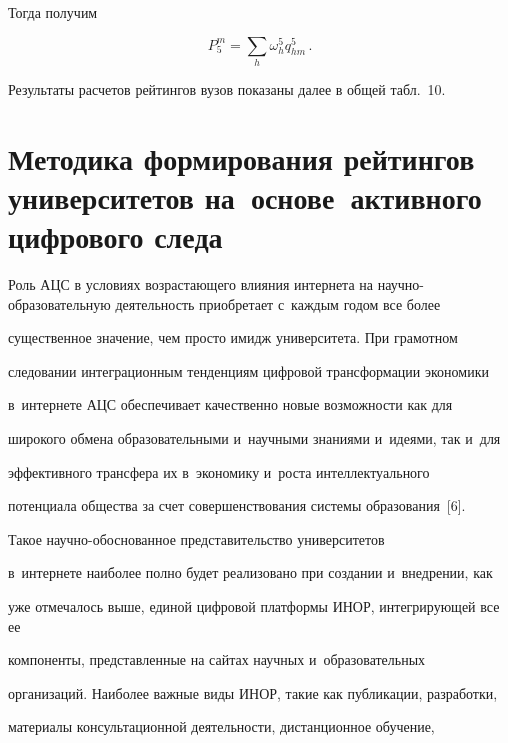 \noindent


Тогда получим


\begin{equation*}


P_5^m= \sum\limits_h \omega^5_h q^5_{hm}\,.




\end{equation*}


  


  Результаты расчетов рейтингов вузов показаны далее в общей табл.~10. 





\section{Методика формирования рейтингов университетов на~основе~активного цифрового следа}





  Роль АЦС в условиях возрастающего влияния интернета на на\-уч\-но-об\-ра\-зо\-ва\-тель\-ную деятельность приобретает с~каждым годом все более 


существенное значение, чем просто имидж университета. При грамотном 


следовании интеграционным тенденциям цифровой трансформации экономики 


в~интернете АЦС обеспечивает качественно новые возможности как для 


широкого обмена образовательными и~научными знаниями и~идеями, так и~для 


эффективного трансфера их в~экономику и~роста интеллектуального 


потенциала общества за счет совершенствования сис\-те\-мы образования~[6]. 


Такое на\-уч\-но-обосно\-ван\-ное представительство университетов 


в~интернете наиболее полно будет реализовано при создании и~внед\-ре\-нии, как 


уже отмечалось выше, единой циф\-ро\-вой платформы ИНОР, интегрирующей все ее 


компоненты, представленные на сайтах научных и~образовательных 


организаций. Наиболее важные виды ИНОР, такие как пуб\-ли\-ка\-ции, разработки, 


материалы консультационной деятельности, дистанционное обуче\-ние,  


